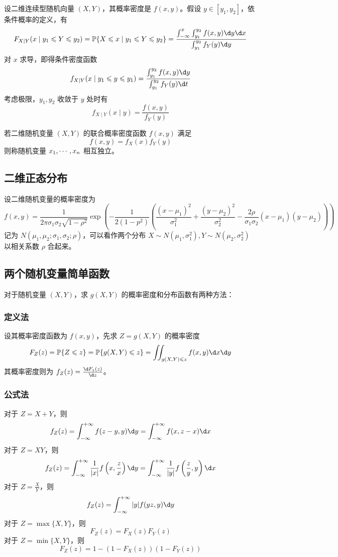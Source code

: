 设二维连续型随机向量 $(X, Y)$，其概率密度是 $f(x, y)$。假设 $y \in [y_1, y_2]$，依条件概率的定义，有
\[ F_{X|Y}(x \mid y_1 \leqslant Y \leqslant y_2) = \bbP\{X \leqslant x \mid y_1 \leqslant Y \leqslant y_2\} = \frac{\int_{-\infty}^x \int_{y_1}^{y_2} f(x, y) \d y \d x }{\int_{y_1}^{y_2} f_Y(y) \d y }\]
对 $x$ 求导，即得条件密度函数
\[ f_{X \mid Y}(x \mid y_1 \leqslant y \leqslant y_1) = \frac{\int_{y_1}^{y_2} f(x, y) \d y}{\int_{y_1}^{y_2} f_{Y}(y) \d t} \]
考虑极限，$y_1, y_2$ 收敛于 $y$ 处时有
\[ f_{X \mid Y}(x \mid y) = \frac{f(x, y)}{f_{Y}(y)} \]

若二维随机变量 $(X,Y)$ 的联合概率密度函数 $f(x,y)$ 满足
\[ f(x,y) = f_{X}(x) f_{Y}(y) \]
则称随机变量 $x_1,\cdots,x_n$ 相互独立。

\subsection{二维正态分布}

设二维随机变量的概率密度为
\[ f(x, y) = \frac{1}{2 \pi \sigma_1 \sigma_2 \sqrt{1 - \rho^2}} \exp \left( -\frac{1}{2(1-p^2)} \left(\frac{(x-\mu_1)^2}{\sigma_1^2} + \frac{(y-\mu_2)^2}{\sigma_2^2} - \frac{2 \rho}{\sigma_1 \sigma_2}(x-\mu_1)(y-\mu_2)\right) \right) \]
记为 $N(\mu_1, \mu_2; \sigma_1, \sigma_2; \rho)$，可以看作两个分布 $X \sim N(\mu_1, \sigma_1^2), Y \sim N(\mu_2, \sigma_2^2)$ 以相关系数 $\rho$ 合起来。

\subsection{两个随机变量简单函数}

对于随机变量 $(X, Y)$，求 $g(X, Y)$ 的概率密度和分布函数有两种方法：

\subsubsection*{定义法}

设其概率密度函数为 $f(x, y)$，先求 $Z = g(X, Y)$ 的概率密度
\[ F_Z(z) = \bbP\{Z \leqslant z\} = \bbP\{g(X,Y) \leqslant z\} = \iint_{g(X,Y) \leqslant z} f(x, y) \d x \d y \]
其概率密度则为 $f_Z(z) = \frac{\d F_z(z)}{\d z}$。

\subsubsection*{公式法}

对于 $Z = X + Y$，则
\[ f_Z(z) = \int_{-\infty}^{+\infty} f(z - y, y) \d y = \int_{-\infty}^{+\infty} f(x, z - x) \d x \]
对于 $Z = XY$，则
\[ f_Z(z) = \int_{-\infty}^{+\infty} \frac{1}{|x|}f\left(x, \frac{z}{x}\right) \d y = \int_{-\infty}^{+\infty} \frac{1}{|y|}f\left(\frac{z}{y}, y\right) \d x \]
对于 $Z = \frac{X}{Y}$，则
\[ f_Z(z) = \int_{-\infty}^{+\infty} |y|f(yz, y) \d y \]
对于 $Z = \max\{X, Y\}$，则
\[ F_Z(z) = F_X(z)F_Y(z) \]
对于 $Z = \min\{X, Y\}$，则
\[ F_Z(z) = 1 - (1 - F_X(z))(1 - F_Y(z)) \]

